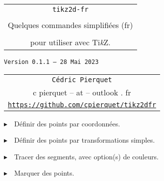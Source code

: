 \documentclass[french,a4paper,11pt]{article}
\def\TPversion{0.1.1}
\def\TPdate{28 Mai 2023}
\providecommand\tikzlogo{Ti\textit{k}Z}
\let\TikZ\tikzlogo
\begin{document}
\setlength{\aweboxleftmargin}{0.07\linewidth}
\setlength{\aweboxcontentwidth}{0.93\linewidth}
\setlength{\aweboxvskip}{8pt}

\pagestyle{fancy}

\thispagestyle{empty}

\vspace{2cm}

\begin{center}
	\begin{minipage}{0.75\linewidth}
	\begin{tcolorbox}[colframe=yellow,colback=yellow!15]
		\begin{center}
			\begin{tabular}{c}
				{\Huge \texttt{tikz2d-fr}}\\
				\\
				{\LARGE Quelques commandes simplifiées (fr)} \\
				\\
				{\LARGE pour utiliser avec \TikZ.} \\
			\end{tabular}
			
			\bigskip
			
			{\small \texttt{Version \TPversion{} -- \TPdate}}
		\end{center}
	\end{tcolorbox}
\end{minipage}
\end{center}

\begin{center}
	\begin{tabular}{c}
	\texttt{Cédric Pierquet}\\
	{\ttfamily c pierquet -- at -- outlook . fr}\\
	\texttt{\url{https://github.com/cpierquet/tikz2dfr}}
\end{tabular}
\end{center}

\vspace{0.25cm}

{$\blacktriangleright$~~Définir des points par coordonnées.}

\smallskip

{$\blacktriangleright$~~Définir des points par transformations simples.}

\smallskip

{$\blacktriangleright$~~Tracer des segments, avec option(s) de couleurs.}

\smallskip

{$\blacktriangleright$~~Marquer des points.}
\end{document}
